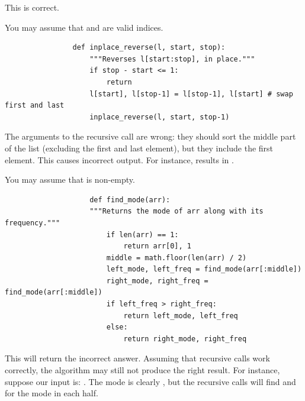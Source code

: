 \begin{prob}
\begin{subprobset}
\begin{subprob}
            \begin{soln}
                This is correct.
            \end{soln}
        \end{subprob}

        \begin{subprob}
            You may assume that  and  are valid indices.
            \begin{verbatim}
                def inplace_reverse(l, start, stop):
                    """Reverses l[start:stop], in place."""
                    if stop - start <= 1:
                        return
                    l[start], l[stop-1] = l[stop-1], l[start] # swap first and last
                    inplace_reverse(l, start, stop-1)
            \end{verbatim}

            \begin{soln}
                The arguments to the recursive call are wrong: they should sort the middle part
                of the list (excluding the first and last element), but they include the first
                element. This causes incorrect output. For instance,  results in
                \python{[3,5,2,4]}.
            \end{soln}
        \end{subprob}


        \begin{subprob}
            You may assume that  is non-empty.

                \begin{verbatim}
                    def find_mode(arr):
                    """Returns the mode of arr along with its frequency."""
                        if len(arr) == 1:
                            return arr[0], 1
                        middle = math.floor(len(arr) / 2)
                        left_mode, left_freq = find_mode(arr[:middle])
                        right_mode, right_freq = find_mode(arr[:middle])
                        if left_freq > right_freq:
                            return left_mode, left_freq
                        else:
                            return right_mode, right_freq
                \end{verbatim}

                \begin{soln}
                    This will return the incorrect answer. Assuming that recursive calls
                    work correctly, the algorithm may still not produce the right result.
                    For instance, suppose our input is:
                    \python{[1, 1, 1, 2, 2, 3, 3, 3, 2, 2]}.
                    The mode is clearly , but the recursive calls will find
                     and  for the mode in each half.


\end{soln}
\end{subprob}
\end{subprobset}
\end{prob}
